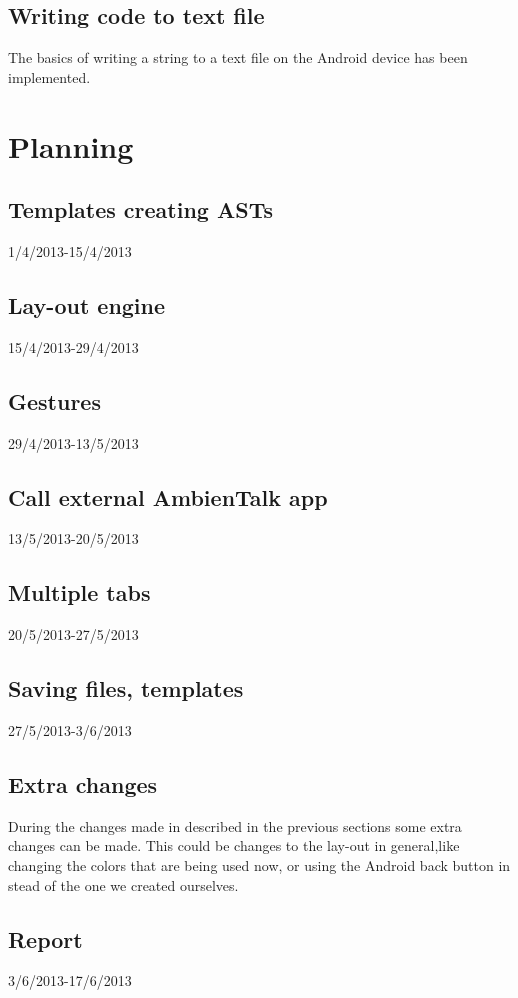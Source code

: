 \documentclass[a4paper,12pt]{report}
\begin{document}
\subsection{Writing code to text file}
The basics of writing a string to a text file on the Android device has been implemented.

\section{Planning}
\subsection{Templates creating ASTs}
1/4/2013-15/4/2013

\subsection{Lay-out engine}
15/4/2013-29/4/2013
\subsection{Gestures}
29/4/2013-13/5/2013
\subsection{Call external AmbienTalk app}
13/5/2013-20/5/2013
\subsection{Multiple tabs}
20/5/2013-27/5/2013
\subsection{Saving files, templates}
27/5/2013-3/6/2013

\subsection{Extra changes}
During the changes made in described in the previous sections some extra changes can be made. This could be changes to the lay-out in general,like changing the colors that are being used now, or using the Android 
back button in stead of the one we created ourselves.
\subsection{Report}
3/6/2013-17/6/2013
\end{document}
